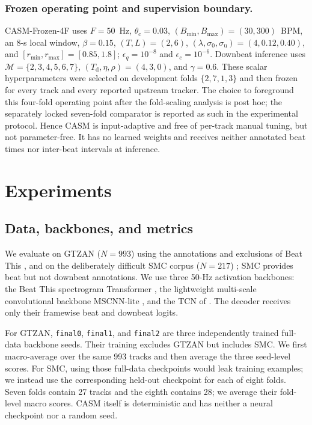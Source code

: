 \documentclass{article}
\begin{document}
\subsubsection{Frozen operating point and supervision boundary.}
CASM-Frozen-4F uses $F=50$~Hz, $\theta_{\mathrm c}=0.03$,
$(B_{\min},B_{\max})=(30,300)$~BPM, an 8-s local window, $\beta=0.15$,
$(T,L)=(2,6)$, $(\lambda,\sigma_0,\sigma_{\mathrm u})=(4,0.12,0.40)$,
and $[r_{\min},r_{\max}]=[0.85,1.8]$; $\epsilon_q=10^{-8}$ and
$\epsilon_c=10^{-6}$.  Downbeat inference uses
$\mathcal M=\{2,3,4,5,6,7\}$, $(T_{\mathrm d},\eta,\rho)=(4,3,0)$, and
$\gamma=0.6$.  These scalar hyperparameters were selected on development folds
$\{2,7,1,3\}$ and then frozen for every track and every reported upstream
tracker.  The choice to foreground this four-fold operating point after the
fold-scaling analysis is post hoc; the separately locked seven-fold comparator
is reported as such in the experimental protocol.  Hence CASM is
input-adaptive and free of per-track manual tuning, but not parameter-free.  It
has no learned weights and receives neither annotated beat times nor
inter-beat intervals at inference.


\section{Experiments}
\label{sec:exp}

\subsection{Data, backbones, and metrics}
We evaluate on GTZAN ($N=993$) using the annotations and exclusions of Beat This \cite{foscarin2024beat}, and on the deliberately difficult SMC corpus ($N=217$) \cite{smc}; SMC provides beat but not downbeat annotations. We use three 50-Hz activation backbones: the Beat This spectrogram Transformer \cite{foscarin2024beat}, the lightweight multi-scale convolutional backbone MSCNN-lite \cite{he2026dynest}, and the TCN of \cite{bock2020deconstruct}. The decoder receives only their framewise beat and downbeat logits.

For GTZAN, \texttt{final0}, \texttt{final1}, and \texttt{final2} are three independently trained full-data backbone seeds. Their training excludes GTZAN but includes SMC. We first macro-average over the same 993 tracks and then average the three seed-level scores. For SMC, using those full-data checkpoints would leak training examples; we instead use the corresponding held-out checkpoint for each of eight folds. Seven folds contain 27 tracks and the eighth contains 28; we average their fold-level macro scores. CASM itself is deterministic and has neither a neural checkpoint nor a random seed.
\end{document}
